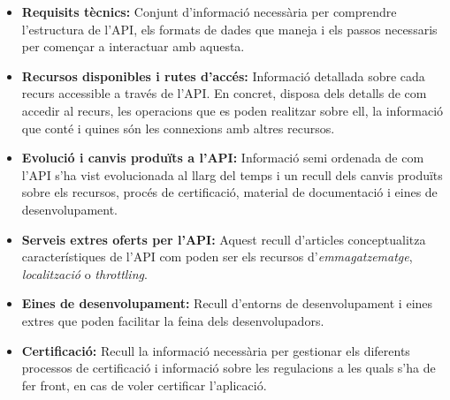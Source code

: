     \begin{itemize}
        \item \textbf{Requisits tècnics:} Conjunt d’informació necessària per comprendre l’estruc\-tura de l'\gls{API}, els formats de dades que maneja i els passos necessaris per començar a interactuar amb aquesta.
        \item \textbf{Recursos disponibles i rutes d’accés:} Informació detallada sobre cada recurs accessible a través de l'\gls{API}. En concret, disposa dels detalls de com accedir al recurs, les operacions que es poden realitzar sobre ell, la informació que conté i quines són les connexions amb altres recursos.
        \item \textbf{Evolució i canvis produïts a l'\gls{API}:} Informació semi ordenada de com l'\gls{API} s’ha vist evolucionada al llarg del temps i un recull dels canvis produïts sobre els recursos, procés de certificació, material de documentació i eines de desenvolupament.
        \item \textbf{Serveis extres oferts per l'\gls{API}:} Aquest recull d’articles conceptualitza ca\-rac\-te\-rís\-ti\-ques de l'\gls{API} com poden ser els recursos d'\emph{emmagatzematge}, \emph{lo\-ca\-lit\-za\-ció} o \emph{throttling}.
        \item \textbf{Eines de desenvolupament:} Recull d’entorns de desenvolupament i eines extres que poden facilitar la feina dels desenvolupadors.
        \item \textbf{Certificació:} Recull la informació necessària per gestionar els diferents processos de certificació i informació sobre les regulacions a les quals s'ha de fer front, en cas de voler certificar l'aplicació.
    \end{itemize}
